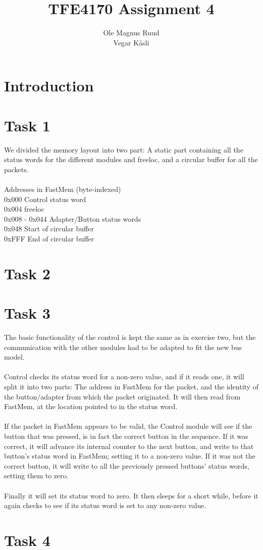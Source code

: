 \documentclass[11pt]{report}
\title{TFE4170 Assignment 4}
\author{Ole Magnus Ruud \\ Vegar K\aa sli}
\begin{document}
\maketitle
\clearpage

\section*{Introduction}


\section*{Task 1}
We divided the memory layout into two part: A static part containing all the
status words for the different modules and freeloc, and a circular buffer for
all the packets. 
\\
\\Addresses in FastMem (byte-indexed)
\\0x000 Control status word
\\0x004 freeloc
\\0x008 - 0x044 Adapter/Button status words
\\0x048 Start of circular buffer
\\0xFFF End of circular buffer

\section*{Task 2}

\section*{Task 3}
The basic functionality of the control is kept the same as in exercise two, but
the communication with the other modules had to be adapted to fit the new bus
model.\\
\\Control checks its status word for a non-zero value, and if it reads one, it
will split it into two parts: The address in FastMem for the packet, and the
identity of the button/adapter from which the packet originated. It will then
read from FastMem, at the location pointed to in the status word.\\
\\If the packet in FastMem appears to be valid, the Control module will see if
the button that was pressed, is in fact the correct button in the sequence. If
it was correct, it will advance its internal counter to the next button, and
write to that button's status word in FastMem; setting it to a non-zero value.
If it was not the correct button, it will write to all the previously pressed
buttons' status words, setting them to zero.\\
\\Finally it will set its status word to zero. It then sleeps for a short 
while, before it again checks to see if its status word is set to any non-zero 
value.

\section*{Task 4}
\end{document}
